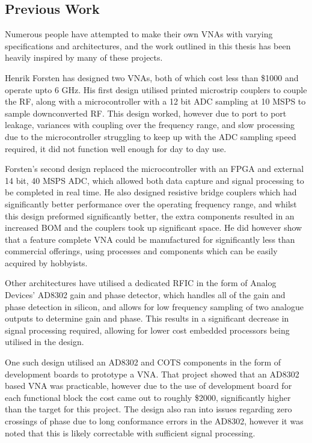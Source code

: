 \newpage
\subsection{Previous Work}
Numerous people have attempted to make their own VNAs with varying specifications and architectures, and the work outlined in this thesis has been heavily inspired by many of these projects. 

Henrik Forsten has designed two VNAs, both of which cost less than \$1000 and operate upto 6 GHz. His first design \cite{henrik_1} utilised printed microstrip couplers to couple the RF, along with a microcontroller with a 12 bit ADC sampling at 10 MSPS to sample downconverted RF. This design worked, however due to port to port leakage, variances with coupling over the frequency range, and slow processing due to the microcontroller struggling to keep up with the ADC sampling speed required, it did not function well enough for day to day use.  

Forsten's second design \cite{henrik_2} replaced the microcontroller with an FPGA and external 14 bit, 40 MSPS ADC, which allowed both data capture and signal processing to be completed in real time. He also designed resistive bridge couplers which had significantly better performance over the operating frequency range, and whilst this design preformed significantly better, the extra components resulted in an increased BOM and the couplers took up significant space. He did however show that a feature complete VNA could be manufactured for significantly less than commercial offerings, using processes and components which can be easily acquired by hobbyists.  

Other architectures have utilised a dedicated RFIC in the form of Analog Devices' AD8302 gain and phase detector, which handles all of the gain and phase detection in silicon, and allows for low frequency sampling of two analogue outputs to determine gain and phase. This results in a significant decrease in signal processing required, allowing for lower cost embedded processors being utilised in the design. 

One such design \cite{nagy_vna} utilised an AD8302 and COTS components in the form of development boards to prototype a VNA. That project showed that an AD8302 based VNA was practicable, however due to the use of development board for each functional block the cost came out to roughly \$2000, significantly higher than the target for this project. The design also ran into issues regarding zero crossings of phase due to long conformance errors in the AD8302, however it was noted that this is likely correctable with sufficient signal processing.  

